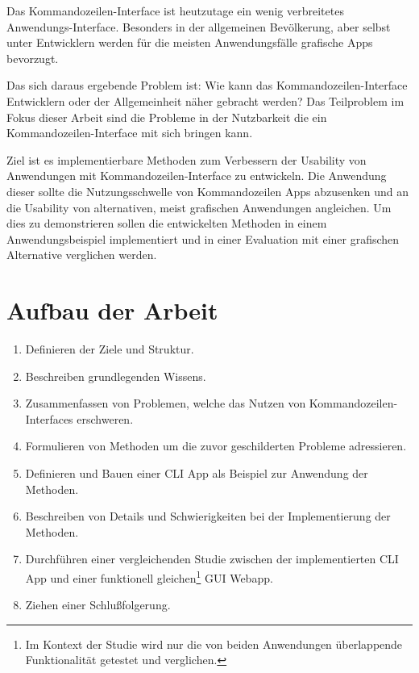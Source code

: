 \documentclass[oneside,bibliography=totocnumbered,BCOR=5mm]{scrbook}
\begin{document}
Das Kommandozeilen-Interface ist heutzutage ein wenig verbreitetes
Anwendungs-Interface. Besonders in der allgemeinen Bevölkerung, aber selbst
unter Entwicklern werden für die meisten Anwendungsfälle grafische Apps
bevorzugt.

Das sich daraus ergebende Problem ist: Wie kann das Kommandozeilen-Interface
Entwicklern oder der Allgemeinheit näher gebracht werden? Das Teilproblem
im Fokus dieser Arbeit sind die Probleme in der Nutzbarkeit die ein
Kommandozeilen-Interface mit sich bringen kann.

Ziel ist es implementierbare Methoden zum Verbessern der Usability von
Anwendungen mit Kommandozeilen-Interface zu entwickeln. Die Anwendung dieser
sollte die Nutzungsschwelle von Kommandozeilen Apps abzusenken und an die
Usability von alternativen, meist grafischen Anwendungen angleichen. Um dies
zu demonstrieren sollen die entwickelten Methoden in einem Anwendungsbeispiel
implementiert und in einer Evaluation mit einer grafischen Alternative
verglichen werden.

\newpage
\section{Aufbau der Arbeit}

\begin{enumerate}
  \item \textbf{}
    \smallbreak
    Definieren der Ziele und Struktur.
  \item \textbf{}
    \smallbreak
    Beschreiben grundlegenden Wissens.
  \item \textbf{}
    \smallbreak
    Zusammenfassen von Problemen, welche das Nutzen von Kommandozeilen-Interfaces erschweren.
  \item \textbf{}
    \smallbreak
    Formulieren von Methoden um die zuvor geschilderten Probleme adressieren.
  \item \textbf{}
    \smallbreak
    Definieren und Bauen einer CLI App als Beispiel zur Anwendung der Methoden.
  \item \textbf{}
    \smallbreak
    Beschreiben von Details und Schwierigkeiten bei der Implementierung der Methoden.
  \item \textbf{}
    \smallbreak
    Durchführen einer vergleichenden Studie zwischen der implementierten CLI App
und einer funktionell gleichen\footnote{Im Kontext der Studie wird nur die von
beiden Anwendungen überlappende Funktionalität getestet und verglichen.} GUI
Webapp.
  \item \textbf{}
    \smallbreak
    Ziehen einer Schlußfolgerung.
\end{enumerate}
\end{document}
